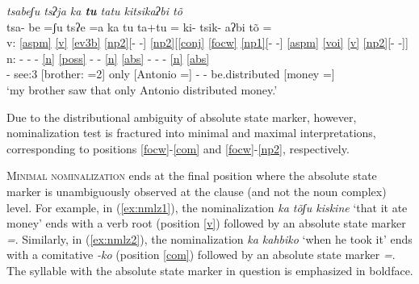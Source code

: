 \documentclass[output=paper]{langscibook}
\begin{document}
\ea \label{ex:nmlzinicial}
 \textit{tsa\2\st{}be\2\4ʃu\3 \ssn tsʔja\3\2 \ssn ka\2 \textbf{tu\1} t\xy a\2\st\ssn tu\4\1 ki\2tsi\2ka\2\st{}ʔbi\3 \st{}tõ\2\4\1}\\
\gllll {} tsa\2- be\2\4 =ʃu\3\ff{} \ssn tsʔe\3\ff{} =a\2 \ssn ka\2 tu\1 t\xy a\3\ff{}+\ssn tu\4 =\1 ki\2- tsi\2k- a\2ʔbi\3\ff{} tõ\2\4 =\1\\
v: \ref{aspm} \ref{v} \ref{ev3b} \ref{np2}[- -] \ref{np2}[\ref{conj} \ref{focw} \ref{np1}[- -] \ref{aspm} \ref{voi} \ref{v} \ref{np2}[- -]]\\
n: - - - \ref{n} \ref{poss} - - \ref{n} \ref{abs} - - - \ref{n} \ref{abs}\\
{} \Pfv- see:3 \Rep{} [brother:\Sap{} =2\Sg{}] \Sub{} only [Antonio =\Abst{}] \Pfv- \Caus- be.distributed [money =\Abst]\\
\glt `my brother saw that only Antonio distributed money.' 
\z


Due to the distributional ambiguity of absolute state marker, however, nominalization test is fractured into minimal and maximal interpretations, corresponding to positions \ref{focw}-\ref{com} and \ref{focw}-\ref{np2}, respectively.

\textsc{Minimal nominalization} ends at the final position where the absolute state marker is unambiguously observed at the clause  (and not the noun complex) level. For example, in (\ref{ex:nmlz1}), the nominalization \textit{\ssn ka\2 tõ\2\4\1ʃu\2 ki\4ski\2ne\2} `that it ate money' ends with a verb root (position \ref{v}) followed by an absolute state marker \textit{=\1}. Similarly, in (\ref{ex:nmlz2}), the nominalization \textit{\ssn ka\2 ka\2hbi\2ko\1\3} `when he took it' ends with a comitative \textit{-ko\1\3} (position \ref{com}) followed by an absolute state marker \textit{=\1}. The syllable with the absolute state marker in question is emphasized in boldface. %
\end{document}
